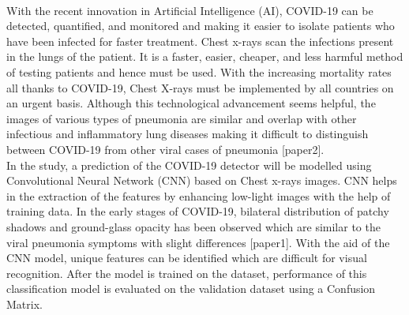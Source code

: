 \documentclass[12pt]{revtex4}
\begin{document}
\\With the recent innovation in Artificial Intelligence (AI), COVID-19 can be detected, quantified, and monitored and making it easier to isolate patients who have been infected for faster treatment. Chest x-rays scan the infections present in the lungs of the patient. It is a faster, easier, cheaper, and less harmful method of testing patients and hence must be used. With the increasing mortality rates all thanks to COVID-19, Chest X-rays must be implemented by all countries on an urgent basis. Although this technological advancement seems helpful, the images of various types of pneumonia are similar and overlap with other infectious and inflammatory lung diseases making it difficult to distinguish between COVID-19 from other viral cases of pneumonia [paper2].
\\In the study, a prediction of the COVID-19 detector will be modelled using Convolutional Neural Network (CNN) based on Chest x-rays images. CNN helps in the extraction of the features by enhancing low-light images with the help of training data. In the early stages of COVID-19, bilateral distribution of patchy shadows and ground-glass opacity has been observed which are similar to the viral pneumonia symptoms with slight differences [paper1]. With the aid of the CNN model, unique features can be identified which are difficult for visual recognition. After the model is trained on the dataset, performance of this classification model is evaluated on the validation dataset using a Confusion Matrix. 
\pagebreak
\end{document}
